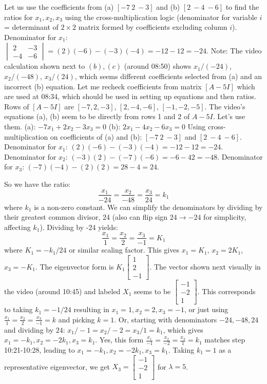 \documentclass{article}
\begin{document}
Let us use the coefficients from (a) $[-7 \ 2 \ -3]$ and (b) $[2 \ -4 \ -6]$ to find the ratios for $x_1, x_2, x_3$ using the cross-multiplication logic (denominator for variable $i$ = determinant of $2 \times 2$ matrix formed by coefficients excluding column $i$).
Denominator for $x_1$: $\begin{vmatrix} 2 & -3 \\ -4 & -6 \end{vmatrix} = (2)(-6) - (-3)(-4) = -12 - 12 = -24$.
Note: The video calculation shown next to $(b), (c)$ (around 08:50) shows $x_1/(-24)$, $x_2/(-48)$, $x_3/(24)$, which seems different coefficients selected from (a) and an incorrect (b) equation. Let me recheck coefficients from matrix $[A-5I]$ which are used at 08:34, which should be used in setting up equations and then ratios.
Rows of $[A-5I]$ are $[-7, 2, -3]$, $[2, -4, -6]$, $[-1, -2, -5]$.
The video's equations (a), (b) seem to be directly from rows 1 and 2 of $A-5I$. Let's use them.
(a): $-7x_1 + 2x_2 - 3x_3 = 0$
(b): $2x_1 - 4x_2 - 6x_3 = 0$
Using cross-multiplication on coefficients of (a) and (b): $[-7 \ 2 \ -3]$ and $[2 \ -4 \ -6]$.
Denominator for $x_1$: $(2)(-6) - (-3)(-4) = -12 - 12 = -24$.
Denominator for $x_2$: $(-3)(2) - (-7)(-6) = -6 - 42 = -48$.
Denominator for $x_3$: $(-7)(-4) - (2)(2) = 28 - 4 = 24$.

So we have the ratio:
\[ \frac{x_1}{-24} = \frac{x_2}{-48} = \frac{x_3}{24} = k_1 \]
where $k_1$ is a non-zero constant.
We can simplify the denominators by dividing by their greatest common divisor, 24 (also can flip sign $24 \to -24$ for simplicity, affecting $k_1$). Dividing by -24 yields:
\[ \frac{x_1}{1} = \frac{x_2}{2} = \frac{x_3}{-1} = K_1 \]
where $K_1 = -k_1/24$ or similar scaling factor.
This gives $x_1 = K_1$, $x_2 = 2K_1$, $x_3 = -K_1$.
The eigenvector form is $K_1 \begin{bmatrix} 1 \\ 2 \\ -1 \end{bmatrix}$.
The vector shown next visually in the video (around 10:45) and labeled $X_1$ seems to be $\begin{bmatrix} -1 \\ -2 \\ 1 \end{bmatrix}$. This corresponds to taking $k_1=-1/24$ resulting in $x_1=1, x_2=2, x_3=-1$, or just using $\frac{x_1}{1} = \frac{x_2}{2} = \frac{x_3}{-1} = k$ and picking $k=1$. Or, starting with denominators $-24, -48, 24$ and dividing by $24$: $x_1/-1 = x_2/-2 = x_3/1 = k_1$, which gives $x_1=-k_1, x_2=-2k_1, x_3=k_1$. Yes, this form $\frac{x_1}{-1} = \frac{x_2}{-2} = \frac{x_3}{1} = k_1$ matches step 10:21-10:28, leading to $x_1=-k_1, x_2=-2k_1, x_3=k_1$.
Taking $k_1=1$ as a representative eigenvector, we get $X_3 = \begin{bmatrix} -1 \\ -2 \\ 1 \end{bmatrix}$ for $\lambda = 5$.
\end{document}
